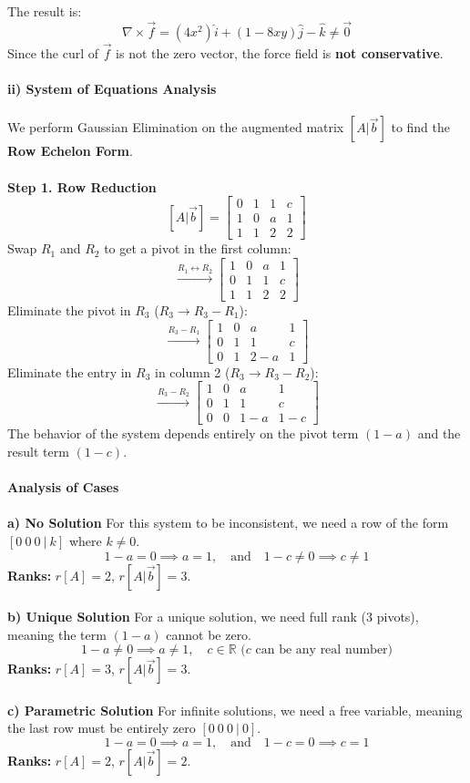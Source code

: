 \documentclass{article}
\begin{document}
The result is:
\[
	\nabla \times \vec{f} = (4x^{2})\hat{i} + (1-8xy)\hat{j} - \hat{k} \neq \vec{0}
\]
Since the curl of $\vec{f}$ is not the zero vector, the force field is \textbf{not conservative}.
\\
\\
\textbf{ii) System of Equations Analysis}
\\
\\
We perform Gaussian Elimination on the augmented matrix $[A|\vec{b}]$ to find
the \textbf{Row Echelon Form}.
\\
\\
\textbf{Step 1. Row Reduction}
\[
	[A|\vec{b}] =
	\left[
		\begin{array}{ccc|c}
			0 & 1 & 1 & c \\
			1 & 0 & a & 1 \\
			1 & 1 & 2 & 2
		\end{array}
		\right]
\]
Swap $R_{1}$ and $R_{2}$ to get a pivot in the first column:
\[
	\xrightarrow{R_{1} \leftrightarrow R_{2}}
	\left[
		\begin{array}{ccc|c}
			1 & 0 & a & 1 \\
			0 & 1 & 1 & c \\
			1 & 1 & 2 & 2
		\end{array}
		\right]
\]
Eliminate the pivot in $R_{3}$ ($R_{3} \to R_{3} - R_{1}$):
\[
	\xrightarrow{R_{3} - R_{1}}
	\left[
		\begin{array}{ccc|c}
			1 & 0 & a   & 1 \\
			0 & 1 & 1   & c \\
			0 & 1 & 2-a & 1
		\end{array}
		\right]
\]
Eliminate the entry in $R_{3}$ in column 2 ($R_{3} \to R_{3} - R_{2}$):
\[
	\xrightarrow{R_{3} - R_{2}}
	\left[
		\begin{array}{ccc|c}
			1 & 0 & a   & 1   \\
			0 & 1 & 1   & c   \\
			0 & 0 & 1-a & 1-c
		\end{array}
		\right]
\]
The behavior of the system depends entirely on the pivot term $(1-a)$ and the
result term $(1-c)$.
\\
\\
\textbf{Analysis of Cases}
\\
\\
\textbf{a) No Solution}
For this system to be inconsistent, we need a row of the form
$[0 \ 0 \ 0 \ | \ k]$ where $k \neq 0$.
\[
	1-a = 0 \implies a = 1, \quad \text{and} \quad 1-c \neq 0 \implies c \neq 1
\]
\textbf{Ranks:} $r[A] = 2$, $r[A|\vec{b}] = 3$.
\\
\\
\textbf{b) Unique Solution}
For a unique solution, we need full rank (3 pivots), meaning the term $(1-a)$ cannot be zero.
\[
	1-a \neq 0 \implies a \neq 1, \quad c \in \mathbb{R} \text{ ($c$ can be any real number)}
\]
\textbf{Ranks:} $r[A] = 3$, $r[A|\vec{b}] = 3$.
\\
\\
\textbf{c) Parametric Solution}
For infinite solutions, we need a free variable, meaning the last row must be entirely zero $[0 \ 0 \ 0 \ | \ 0]$.
\[
	1-a = 0 \implies a = 1, \quad \text{and} \quad 1-c = 0 \implies c = 1
\]
\textbf{Ranks:} $r[A] = 2$, $r[A|\vec{b}] = 2$.
\end{document}
